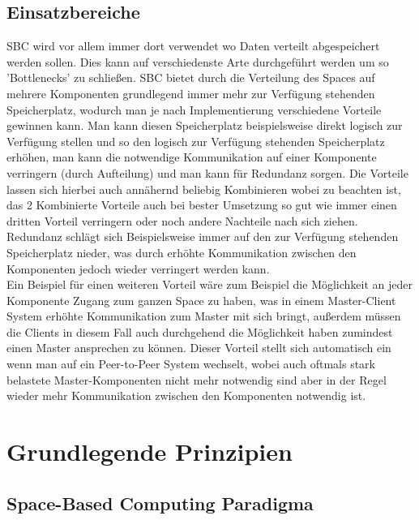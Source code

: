 \documentclass[a4paper,12pt]{scrreprt}
\begin{document}
	\section{Einsatzbereiche}
		SBC wird vor allem immer dort verwendet wo Daten verteilt abgespeichert werden sollen. Dies kann auf verschiedenste Arte durchgeführt werden um so 'Bottlenecks' %
		zu schließen. SBC bietet durch die Verteilung des Spaces auf mehrere Komponenten grundlegend immer mehr zur Verfügung stehenden Speicherplatz, wodurch man je nach Implementierung verschiedene Vorteile gewinnen kann. Man kann diesen Speicherplatz beispielsweise direkt logisch zur Verfügung stellen und so den logisch zur Verfügung stehenden Speicherplatz erhöhen, man kann die notwendige  Kommunikation auf einer Komponente verringern (durch Aufteilung) und man kann für Redundanz sorgen. Die Vorteile lassen sich hierbei auch annähernd beliebig Kombinieren wobei zu beachten ist, das 2 Kombinierte Vorteile auch bei bester Umsetzung so gut wie immer einen dritten Vorteil verringern oder noch andere Nachteile nach sich ziehen. Redundanz schlägt sich Beispielsweise immer auf den zur Verfügung stehenden Speicherplatz nieder, was durch erhöhte Kommunikation zwischen den Komponenten jedoch wieder verringert werden kann. \\    Ein Beispiel für einen weiteren Vorteil wäre zum Beispiel die Möglichkeit an jeder Komponente Zugang zum ganzen Space zu haben, was in einem Master-Client System erhöhte Kommunikation zum Master mit sich bringt, außerdem müssen die Clients in diesem Fall auch durchgehend die Möglichkeit haben zumindest einen Master ansprechen zu können. Dieser Vorteil stellt sich automatisch ein wenn man auf ein Peer-to-Peer System wechselt, wobei auch oftmals stark belastete Master-Komponenten nicht mehr notwendig sind aber in der Regel wieder mehr Kommunikation zwischen den Komponenten notwendig ist.
\chapter{Grundlegende Prinzipien}
	
	\section{Space-Based Computing Paradigma}
		
\end{document}
